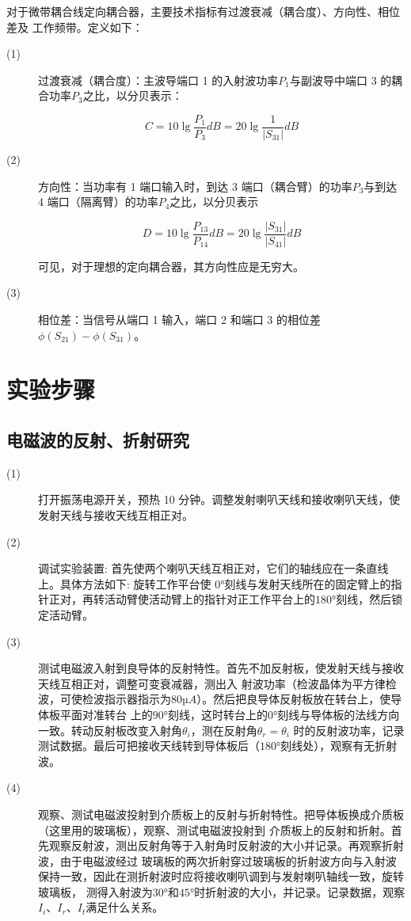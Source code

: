 \documentclass[UTF8]{ctexart}
\begin{document}
对于微带耦合线定向耦合器，主要技术指标有过渡衰减（耦合度）、方向性、相位差及
工作频带。定义如下：

\begin{description}
    \item[(1)] 过渡衰减（耦合度）：主波导端口 1 的入射波功率$P_1$与副波导中端口 3 的耦合功率$P_3$之比，以分贝表示：
    
    $$
    C=10\lg\frac{P_1}{P_3}dB=20\lg\frac{1}{\left|S_{31}\right|}dB
    $$

    \item[(2)] 方向性：当功率有 1 端口输入时，到达 3 端口（耦合臂）的功率$P_3$与到达 4 端口（隔离臂）的功率$P_4$之比，以分贝表示
    
    $$
    D=10\lg\frac{P_{13}}{P_{14}}dB=20\lg\frac{\left|S_{31}\right|}{\left|S_{41}\right|}dB
    $$
    
    可见，对于理想的定向耦合器，其方向性应是无穷大。

    \item[(3)] 相位差：当信号从端口 1 输入，端口 2 和端口 3 的相位差$\phi(S_{21}) - \phi(S_{31})$。
\end{description}



\section{实验步骤}
\subsection{电磁波的反射、折射研究}


\begin{description}
    \item[(1)] 打开振荡电源开关，预热 10 分钟。调整发射喇叭天线和接收喇叭天线，使发射天线与接收天线互相正对。
    
    \item[(2)] 调试实验装置: 首先使两个喇叭天线互相正对，它们的轴线应在一条直线上。具体方法如下: 旋转工作平台使
    $0°$刻线与发射天线所在的固定臂上的指针正对，再转活动臂使活动臂上的指针对正工作平台上的$180°$刻线，然后锁定活动臂。

    \item[(3)] 测试电磁波入射到良导体的反射特性。首先不加反射板，使发射天线与接收天线互相正对，调整可变衰减器，测出入
    射波功率（检波晶体为平方律检波，可使检波指示器指示为$80µA$）。然后把良导体反射板放在转台上，使导体板平面对准转台
    上的$90°$刻线，这时转台上的$0°$刻线与导体板的法线方向一致。转动反射板改变入射角$\theta_i$，测在反射角$\theta_r=\theta_i$
    时的反射波功率，记录测试数据。最后可把接收天线转到导体板后（$180°$刻线处），观察有无折射波。

    \item[(4)] 观察、测试电磁波投射到介质板上的反射与折射特性。把导体板换成介质板（这里用的玻璃板），观察、测试电磁波投射到
    介质板上的反射和折射。首先观察反射波，测出反射角等于入射角时反射波的大小并记录。再观察折射波，由于电磁波经过
    玻璃板的两次折射穿过玻璃板的折射波方向与入射波保持一致，因此在测折射波时应将接收喇叭调到与发射喇叭轴线一致，旋转玻璃板，
    测得入射波为$30°$和$45°$时折射波的大小，并记录。记录数据，观察$I_i$、$I_r$、$I_t$满足什么关系。
\end{description}
\end{document}
